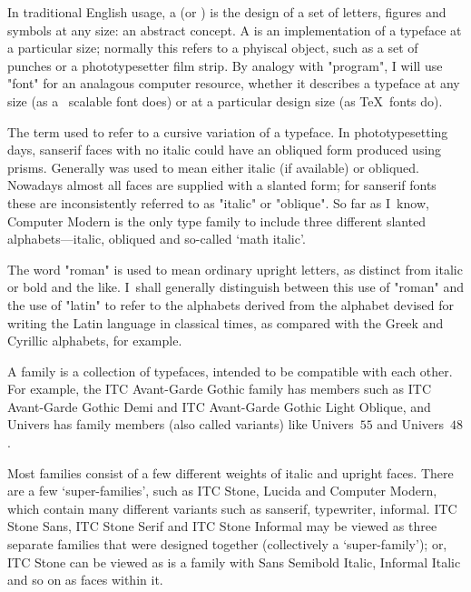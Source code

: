 \iflong
{}

	In traditional English usage, a  (or )
	is the design of a set of letters, figures and symbols at any
	size: an abstract concept.  A  is an implementation
	of a typeface at a particular size; normally this refers to a
	phyiscal object, such as a set of punches or a phototypesetter
	film strip.  By analogy with "program", I will use "font" for an
	analagous computer resource, whether it describes a typeface at
	any size (as a \PS\ scalable font does) or at a particular
	design size (as \TeX\ fonts do).


	The term  used to refer to a cursive variation of a
	typeface.  In phototypesetting days, sanserif faces with no
	italic could have an obliqued form produced using prisms.
	Generally  was used to mean either italic (if
	available) or obliqued.  Nowadays almost all faces are supplied
	with a slanted form; for sanserif fonts these are inconsistently
	referred to as "italic" or "oblique".  So far as I~know,
	Computer Modern is the only type family to include three
	different slanted alphabets---italic, obliqued and so-called
	`math italic'.

	The word "roman" is used to mean ordinary upright letters, as
	distinct from italic or bold and the like.  I~shall generally
	distinguish between this use of "roman" and the use of "latin"
	to refer to the alphabets derived from the alphabet devised for
	writing the Latin language in classical times, as compared with
	the Greek and Cyrillic alphabets, for example.

\iffalse
{}

	A family is a collection of typefaces, intended to be compatible
	with each other.  For example, the ITC Avant-Garde Gothic family
	has members such as ITC Avant-Garde Gothic Demi and ITC
	Avant-Garde Gothic Light Oblique, and Univers has family members
	(also called variants) like Univers~$55$ and Univers~$48$.

	Most families consist of a few different weights of italic and
	upright faces.  There are a few `super-families', such as ITC
	Stone, Lucida and Computer Modern, which contain many different
	variants such as sanserif, typewriter, informal.  ITC Stone
	Sans, ITC Stone Serif and ITC Stone Informal may be viewed as
	three separate families that were designed together
	(collectively a `super-family'); or, ITC Stone can be viewed as
	is a family with Sans Semibold Italic, Informal Italic and so on
	as faces within it.

